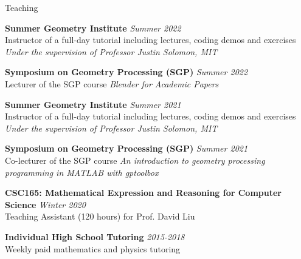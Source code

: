\documentclass{resume}
\newcommand{\cvitembig}[4]{
    {\bf #1} \hfill {\em \small #2} \\ 
    {\small#3 }\\
    {\it \small #4}
}
\newcommand{\cvitem}[3]{
    {\bf #1} \hfill {\em \small #2} \\ 
    {\small#3 }
}
\begin{document}
\begin{rSection}{Teaching}

\cvitembig{Summer Geometry Institute}{Summer 2022}{Instructor of a full-day tutorial including lectures, coding demos and exercises}{Under the supervision of Professor Justin Solomon, MIT}

\cvitem{Symposium on Geometry Processing (SGP)}{Summer 2022}{Lecturer of the SGP course {\it Blender for Academic Papers}}

\cvitembig{Summer Geometry Institute}{Summer 2021}{Instructor of a full-day tutorial including lectures, coding demos and exercises}{Under the supervision of Professor Justin Solomon, MIT}

\cvitem{Symposium on Geometry Processing (SGP)}{Summer 2021}{Co-lecturer of the SGP course {\it An introduction to geometry processing  programming in MATLAB with gptoolbox}}

\cvitem{CSC165: Mathematical Expression and Reasoning for Computer Science}{Winter 2020}{Teaching Assistant (120 hours) for Prof. David Liu}

\cvitem{Individual High School Tutoring}{2015-2018}{Weekly paid mathematics and physics tutoring}

\end{rSection}
\end{document}
